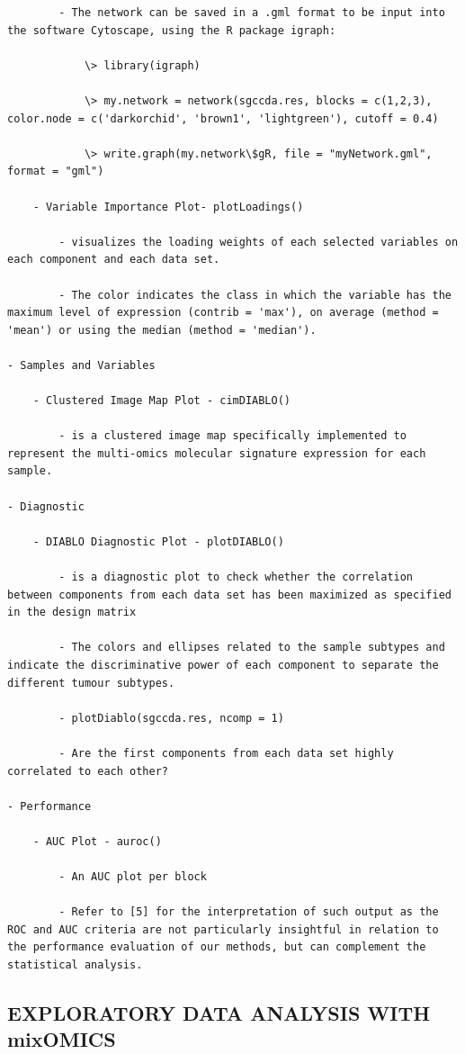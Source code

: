 \documentclass[
]{book}
\begin{document}
\begin{verbatim}
        - The network can be saved in a .gml format to be input into the software Cytoscape, using the R package igraph:

            \> library(igraph)

            \> my.network = network(sgccda.res, blocks = c(1,2,3), color.node = c('darkorchid', 'brown1', 'lightgreen'), cutoff = 0.4)

            \> write.graph(my.network\$gR, file = "myNetwork.gml", format = "gml")

    - Variable Importance Plot- plotLoadings()

        - visualizes the loading weights of each selected variables on each component and each data set.

        - The color indicates the class in which the variable has the maximum level of expression (contrib = 'max'), on average (method = 'mean') or using the median (method = 'median').

- Samples and Variables

    - Clustered Image Map Plot - cimDIABLO()

        - is a clustered image map specifically implemented to represent the multi-omics molecular signature expression for each sample.

- Diagnostic

    - DIABLO Diagnostic Plot - plotDIABLO()

        - is a diagnostic plot to check whether the correlation between components from each data set has been maximized as specified in the design matrix

        - The colors and ellipses related to the sample subtypes and indicate the discriminative power of each component to separate the different tumour subtypes.

        - plotDiablo(sgccda.res, ncomp = 1)

        - Are the first components from each data set highly correlated to each other?

- Performance

    - AUC Plot - auroc()

        - An AUC plot per block

        - Refer to [5] for the interpretation of such output as the ROC and AUC criteria are not particularly insightful in relation to the performance evaluation of our methods, but can complement the statistical analysis.
\end{verbatim}

\hypertarget{exploratory-data-analysis-with-mixomics}{%
\subsection{EXPLORATORY DATA ANALYSIS WITH mixOMICS}\label{exploratory-data-analysis-with-mixomics}}
\end{document}
